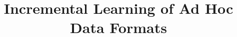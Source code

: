 \documentclass{acm_proc_article-sp}
\begin{document}
%
\title{Incremental Learning of Ad Hoc Data Formats}




% 






\maketitle
\end{document}
